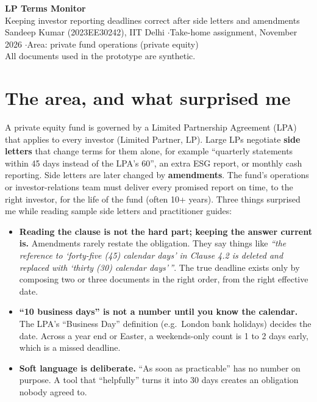 \documentclass[10pt,a4paper]{article}
\begin{document}
\begin{center}
{\LARGE\bfseries\color{navy} LP Terms Monitor}\\[0.6ex]
{\large Keeping investor reporting deadlines correct after side letters and amendments}\\[0.8ex]
{\small Sandeep Kumar (2023EE30242), IIT Delhi \quad$\cdot$\quad Take-home assignment, November 2026 \quad$\cdot$\quad Area: private fund operations (private equity)\\
All documents used in the prototype are synthetic.}
\end{center}
\vspace{-1ex}

\section{The area, and what surprised me}
A private equity fund is governed by a Limited Partnership Agreement (LPA) that applies to every investor (Limited Partner, LP). Large LPs negotiate \textbf{side letters} that change terms for them alone, for example ``quarterly statements within 45 days instead of the LPA's 60'', an extra ESG report, or monthly cash reporting. Side letters are later changed by \textbf{amendments}. The fund's operations or investor-relations team must deliver every promised report on time, to the right investor, for the life of the fund (often 10+ years). Three things surprised me while reading sample side letters and practitioner guides:
\begin{itemize}
  \item \textbf{Reading the clause is not the hard part; keeping the answer current is.} Amendments rarely restate the obligation. They say things like \emph{``the reference to `forty-five (45) calendar days' in Clause 4.2 is deleted and replaced with `thirty (30) calendar days'\,''}. The true deadline exists only by composing two or three documents in the right order, from the right effective date.
  \item \textbf{``10 business days'' is not a number until you know the calendar.} The LPA's ``Business Day'' definition (e.g.\ London bank holidays) decides the date. Across a year end or Easter, a weekends-only count is 1 to 2 days early, which is a missed deadline.
  \item \textbf{Soft language is deliberate.} ``As soon as practicable'' has no number on purpose. A tool that ``helpfully'' turns it into 30 days creates an obligation nobody agreed to.
\end{itemize}
\end{document}
